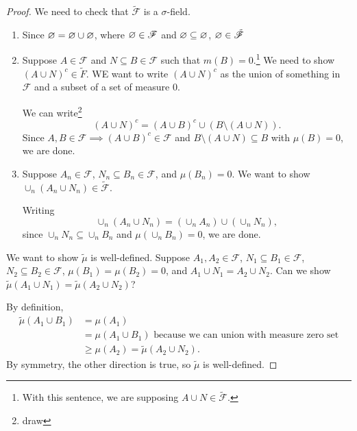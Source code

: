 \begin{proof}
	We need to check that $\tilde{\mathscr{F}}$ is a $\sigma$-field.
	\begin{enumerate}[label=(\roman*)]
		\item Since $\varnothing = \varnothing \cup \varnothing$, where $\varnothing \in \mathscr{F}$ and $\varnothing \subseteq \varnothing$, $\varnothing \in \tilde{\mathscr{F}}$
		\item Suppose $A \in \mathscr{F}$ and $N \subseteq B \in \mathscr{F}$ such that $m(B)=  0$.\footnote{With this sentence, we are supposing $A \cup N \in \tilde{\mathscr{F}}$.} We need to show $\left( A \cup N \right)^{c} \in \tilde{F}$. WE want to write $\left( A \cup N \right)^{c}$ as the union of something in $\mathscr{F}$ and a subset of a set of measure $0$.

			We can write\footnote{draw} \[
				\left( A \cup N \right)^{c} = \left( A \cup B \right)^{c} \cup \left( B \setminus \left( A \cup N \right) \right)
			.\] Since $A,B \in \mathscr{F} \implies \left( A \cup B \right)^{c} \in \mathscr{F}$ and $B \setminus \left( A \cup N \right) \subseteq B$ with $\mu(B) = 0$, we are done.
		\item Suppose $A_n \in \mathscr{F}$, $N_n \subseteq B_n \in \mathscr{F}$, and $\mu(B_n) = 0$. We want to show $\cup_n \left( A_n \cup N_n \right) \in \tilde{\mathscr{F}}$.

			Writing \[
				\cup_n \left( A_n \cup N_n \right) = \left( \cup_n A_n \right)\cup \left( \cup_n N_n \right)
			,\] since $\cup_n N_n \subseteq \cup_n B_n$ and $\mu(\cup_n B_n) = 0$, we are done.
	\end{enumerate}

	We want to show $\tilde{\mu}$ is well-defined. Suppose $A_1,A_2 \in \mathscr{F}$, $N_1 \subseteq B_1 \in \mathscr{F}$, $N_2 \subseteq B_2 \in \mathscr{F}$, $\mu(B_1) = \mu(B_2) = 0$, and $A_1 \cup N_1 = A_2 \cup N_2$. Can we show $\tilde{\mu}(A_1 \cup N_1) = \tilde{\mu}(A_2 \cup N_2)$?

	By definition,
	\begin{align*}
		\tilde{\mu}(A_1 \cup B_1) &= \mu(A_1) \\
		&= \mu(A_1 \cup B_1) \text{ because we can union with measure zero set} \\
		&\ge \mu(A_2) = \tilde{\mu}(A_2 \cup N_2)
	.\end{align*} By symmetry, the other direction is true, so $\tilde{\mu}$ is well-defined.


\end{proof}
